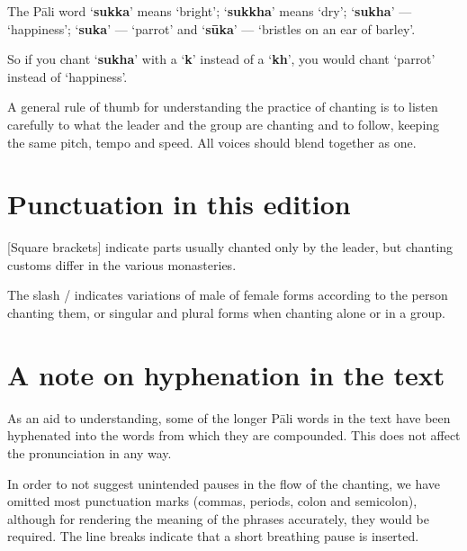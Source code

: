 The Pāli word ‘\textbf{sukka}’ means ‘bright’; ‘\textbf{sukkha}’ means
‘dry’; ‘\textbf{sukha}’ --- ‘happiness’; ‘\textbf{suka}’ --- ‘parrot’ and
‘\textbf{sūka}’ --- ‘bristles on an ear of barley’.

So if you chant ‘\textbf{sukha}’ with a ‘\textbf{k}’ instead of a
‘\textbf{kh}’, you would chant ‘parrot’ instead of ‘happiness’.

A general rule of thumb for understanding the practice of chanting is to
listen carefully to what the leader and the group are chanting and to
follow, keeping the same pitch, tempo and speed. All voices should blend
together as one.

\section*{Punctuation in this edition}

[Square brackets] indicate parts usually chanted only by the leader, but
chanting customs differ in the various monasteries.

The slash / indicates variations of male of female forms according to
the person chanting them, or singular and plural forms when chanting
alone or in a group.

\section*{A note on hyphenation in the text}

As an aid to understanding, some of the longer Pāli words in the text have been
hyphenated into the words from which they are compounded. This does not affect
the pronunciation in any way.

In order to not suggest unintended pauses in the flow of the chanting, we have
omitted most punctuation marks (commas, periods, colon and semicolon), although
for rendering the meaning of the phrases accurately, they would be required.
The line breaks indicate that a short breathing pause is inserted.

